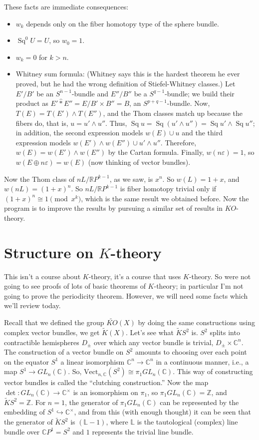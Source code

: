 \documentclass{article}
\newcommand{\Z}{\mathbb{Z}}
\newcommand{\C}{\mathbb{C}}
\newcommand{\R}{\mathbb{R}}
\newcommand{\RP}{\R P}
\newcommand{\CP}{\C P}
\newcommand{\bundle}[1]{\mathbb{#1}}
\newcommand{\sprod}{\wedge}
\newcommand{\into}{\hookrightarrow}
\DeclareMathOperator{\Sq}{Sq}
\begin{document}
These facts are immediate consequences:
\begin{itemize}
\item $w_k$ depends only on the fiber homotopy type of the sphere bundle.
\item $\Sq^0 U = U$, so $w_0 = 1$.
\item $w_k = 0$ for $k > n$.
\item Whitney sum formula: (Whitney says this is the hardest theorem he ever proved, but he had the wrong definition of Stiefel-Whitney classes.)  Let $E' / B'$ be an $S^{n-1}$-bundle and $E'' / B''$ be a $S^{q-1}$-bundle; we build their product as $E' \hat\ast E'' = E / B' \times B'' = B$, an $S^{p+q-1}$-bundle.  Now, $T(E) = T(E') \sprod T(E'')$, and the Thom classes match up because the fibers do, that is, $u = u' \sprod u''$.  Thus, $\Sq u = \Sq(u' \sprod u'') = \Sq u' \sprod \Sq u''$; in addition, the second expression models $w(E) \cup u$ and the third expression models $w(E') \sprod w(E'') \cup u' \sprod u''$.  Therefore, $w(E) = w(E') \sprod w(E'')$ by the Cartan formula.  Finally, $w(n\varepsilon) = 1$, so $w(E \oplus n\varepsilon) = w(E)$ (now thinking of vector bundles).
\end{itemize}

Now the Thom class of $nL / \RP^{k-1}$, as we saw, is $x^n$.  So $w(L) = 1 + x$, and $w(nL) = (1+x)^n$.  So $nL / \RP^{k-1}$ is fiber homotopy trivial only if $(1+x)^n \cong 1 \pmod{x^k}$, which is the same result we obtained before.  Now the program is to improve the results by pursuing a similar set of results in $KO$-theory.


\section{Structure on $K$-theory} %

This isn't a course about $K$-theory, it's a course that uses $K$-theory.  So were not going to see proofs of lots of basic theorems of $K$-theory; in particular I'm not going to prove the periodicity theorem.  However, we will need some facts which we'll review today.

Recall that we defined the group $\widetilde{KO}(X)$ by doing the same constructions using complex vector bundles, we get $\tilde K(X)$.  Let's see what $\tilde K S^2$ is.  $S^2$ splits into contractible hemispheres $D_\pm$ over which any vector bundle is trivial, $D_\pm \times \C^n$.  The construction of a vector bundle on $S^2$ amounts to choosing over each point on the equator $S^1$ a linear isomorphism $\C^n \to \C^n$ in a continuous manner, i.e., a map $S^1 \to GL_n(\C)$.  So, $\mathrm{Vect}_{n,\C}(S^2) \cong \pi_1 GL_n(\C)$.  This way of constructing vector bundles is called the ``clutching construction.''  Now the map $\det: GL_n(\C) \to \C^\times$ is an isomorphism on $\pi_1$, so $\pi_1 GL_n(\C) = \Z$, and $\tilde K S^2 = \Z$.  For $n = 1$, the generator of $\pi_1 GL_n(\C)$ can be represented by the embedding of $S^1 \into \C^\times$, and from this (with enough thought) it can be seen that the generator of $\tilde K S^2$ is $(\bundle{L} - 1)$, where $\bundle{L}$ is the tautological (complex) line bundle over $\CP^1 = S^2$ and $1$ represents the trivial line bundle.
\end{document}
